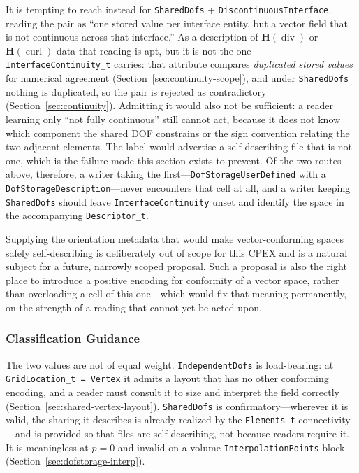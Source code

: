 \documentclass[11pt,letterpaper]{article}
\begin{document}
It is tempting to reach instead for \texttt{SharedDofs} +
\texttt{DiscontinuousInterface}, reading the pair as ``one stored value
per interface entity, but a vector field that is not continuous across
that interface.''  As a description of $\boldsymbol{H}(\operatorname{div})$
or $\boldsymbol{H}(\operatorname{curl})$ data that reading is apt, but it
is not the one \texttt{InterfaceContinuity\_t} carries: that attribute
compares \emph{duplicated stored values} for numerical agreement
(Section~\ref{sec:continuity-scope}), and under \texttt{SharedDofs}
nothing is duplicated, so the pair is rejected as contradictory
(Section~\ref{sec:continuity}).  Admitting it would also not be
sufficient: a reader learning only ``not fully continuous'' still cannot
act, because it does not know which component the shared DOF constrains
or the sign convention relating the two adjacent elements.  The label
would advertise a self-describing file that is not one, which is the
failure mode this section exists to prevent.  Of the two routes above,
therefore, a writer taking the first---\texttt{DofStorageUserDefined}
with a \texttt{DofStorageDescription}---never encounters that cell at
all, and a writer keeping \texttt{SharedDofs} should leave
\texttt{InterfaceContinuity} unset and identify the space in the
accompanying \texttt{Descriptor\_t}.

Supplying the orientation metadata that would make vector-conforming
spaces safely self-describing is deliberately out of scope for this
CPEX and is a natural subject for a future, narrowly scoped proposal.
Such a proposal is also the right place to introduce a positive encoding
for conformity of a vector space, rather than overloading a cell of this
one---which would fix that meaning permanently, on the strength of a
reading that cannot yet be acted upon.

\subsubsection{Classification Guidance}

The two values are not of equal weight.
\texttt{IndependentDofs} is load-bearing: at
\texttt{GridLocation\_t = Vertex} it admits a layout that has no other
conforming encoding, and a reader must consult it to size and interpret
the field correctly (Section~\ref{sec:shared-vertex-layout}).
\texttt{SharedDofs} is confirmatory---wherever it is valid, the sharing
it describes is already realized by the \texttt{Elements\_t}
connectivity---and is provided so that files are self-describing, not
because readers require it.  It is meaningless at $p=0$ and invalid on a
volume \texttt{InterpolationPoints} block
(Section~\ref{sec:dofstorage-interp}).
\end{document}
